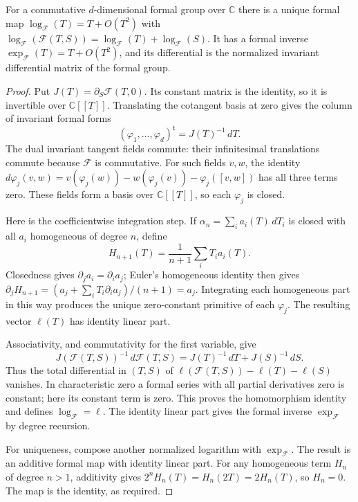 \documentclass[11pt,letterpaper]{article}
\numberwithin{equation}{section}
\theoremstyle{definition}
\theoremstyle{remark}
\newcommand{\C}{\mathbb C}
\begin{document}
\begin{lemma}
\label{diff:aut:lem:formallog}
For a commutative $d$-dimensional formal group over $\C$ there is a unique formal
map $\log_{\mathcal F}(T)=T+O(T^{2})$ with
$\log_{\mathcal F}(\mathcal F(T,S))=\log_{\mathcal F}(T)+\log_{\mathcal F}(S)$. It has
a formal inverse $\exp_{\mathcal F}(T)=T+O(T^{2})$, and its differential is the
normalized invariant differential matrix of the formal group.
\end{lemma}
\begin{proof}
Put $J(T)=\partial_S\mathcal F(T,0)$. Its constant matrix is the
identity, so it is invertible over $\C[[T]]$. Translating the
cotangent basis at zero gives the column of invariant formal forms
\[
 (\varphi_1,\ldots,\varphi_d)^{\mathsf t}=J(T)^{-1}\,dT.
\]
The dual invariant tangent fields commute: their infinitesimal
translations commute because $\mathcal F$ is commutative.
For such fields $v,w$, the identity
$d\varphi_j(v,w)=v(\varphi_j(w))-w(\varphi_j(v))-\varphi_j([v,w])$
has all three terms zero. These fields form a basis over
$\C[[T]]$, so each $\varphi_j$ is closed.

Here is the coefficientwise integration step. If
$\alpha_n=\sum_i a_i(T)\,dT_i$ is closed with all $a_i$
homogeneous of degree $n$, define
\[
 H_{n+1}(T)=\frac{1}{n+1}\sum_i T_i a_i(T).
\]
Closedness gives $\partial_j a_i=\partial_i a_j$; Euler's
homogeneous identity then gives
$\partial_j H_{n+1}=(a_j+\sum_iT_i\partial_i a_j)/(n+1)=a_j$.
Integrating each homogeneous part in this way produces the unique
zero-constant primitive of each $\varphi_j$. The resulting vector
$\ell(T)$ has identity linear part.

Associativity, and commutativity for the first variable, give
\[
 J(\mathcal F(T,S))^{-1}\,d\mathcal F(T,S)
 =J(T)^{-1}\,dT+J(S)^{-1}\,dS.
\]
Thus the total differential in $(T,S)$ of
$\ell(\mathcal F(T,S))-\ell(T)-\ell(S)$ vanishes.
In characteristic zero a formal series with all partial derivatives
zero is constant; here its constant term is zero. This proves the
homomorphism identity and defines $\log_{\mathcal F}=\ell$.
The identity linear part gives the formal inverse
$\exp_{\mathcal F}$ by degree recursion.

For uniqueness, compose another normalized logarithm with
$\exp_{\mathcal F}$. The result is an additive formal map with
identity linear part. For any homogeneous term $H_n$ of degree
$n>1$, additivity gives $2^nH_n(T)=H_n(2T)=2H_n(T)$,
so $H_n=0$. The map is the identity, as required.
\end{proof}
\end{document}
